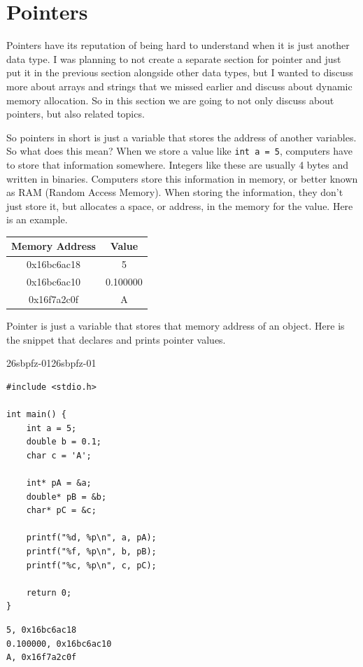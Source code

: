 \documentclass[../../../main.tex]{subfiles}
\begin{document}
\section{Pointers}\label{sec:26sbpfz}

Pointers have its reputation of being hard to understand when it is
just another data type. I was planning to not create a separate
section for pointer and just put it in the previous section alongside
other data types, but I wanted to discuss more about arrays and
strings that we missed earlier and discuss about dynamic memory
allocation. So in this section we are going to not only discuss
about pointers, but also related topics.

So pointers in short is just a variable that stores the address
of another variables. So what does this mean? When we store a
value like \verb|int a = 5|, computers have to store that information
somewhere. Integers like these are usually 4 bytes and written in
binaries. Computers store this information in memory, or better
known as RAM (Random Access Memory). When storing the information,
they don't just store it, but allocates a space, or address, in the
memory for the value. Here is an example.

\begin{center}
\begin{tabular}{|c|c|}
    \hline
    \textbf{Memory Address} & \textbf{Value} \\
    \hline
    0x16bc6ac18 & 5 \\
    \hline
    0x16bc6ac10 & 0.100000 \\
    \hline
    0x16f7a2c0f & A \\
    \hline
\end{tabular}
\end{center}

Pointer is just a variable that stores that memory address of an
object. Here is the snippet that declares and prints pointer values.

\begin{cbox}{26sbpfz-01}{26sbpfz-01}
\begin{lstlisting}[style=cstyle]
#include <stdio.h>

int main() {
    int a = 5;
    double b = 0.1;
    char c = 'A';

    int* pA = &a;
    double* pB = &b;
    char* pC = &c;

    printf("%d, %p\n", a, pA);
    printf("%f, %p\n", b, pB);
    printf("%c, %p\n", c, pC);

    return 0;
}
\end{lstlisting}
\end{cbox}
\begin{outputbox}
\begin{lstlisting}[style=basic]
5, 0x16bc6ac18
0.100000, 0x16bc6ac10
A, 0x16f7a2c0f
\end{lstlisting}
\end{outputbox}
\end{document}
